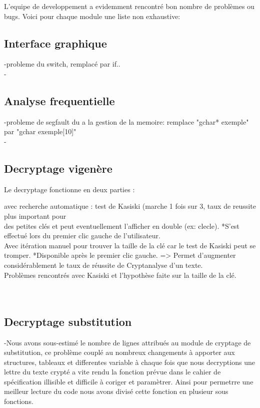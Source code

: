 \documentclass[a4]{article}
\begin{document}
	L'equipe de developpement a evidemment rencontré bon nombre de problèmes ou bugs. Voici pour chaque
	module une liste non exhaustive:
	\subsection{Interface graphique}
	-probleme du switch, remplacé par if..\\
	-
	\subsection{Analyse frequentielle}
	-probleme de segfault du a la gestion de la memoire: remplace "gchar* exemple" par "gchar exemple[10]"\\
	-
	\subsection{Decryptage vigenère}
 		Le decryptage fonctionne en deux parties :
 		
 		avec recherche automatique : test de Kasiski (marche 1 fois sur 3, taux de reussite plus important pour \\
 		des petites clés et peut eventuellement l'afficher en double (ex: clecle). 
 		*S'est effectué lors du premier clic gauche de l'utilisateur. \\
 		
 		Avec itération manuel pour trouver la taille de la clé car le test de Kasiski peut se tromper.
 		*Disponible après le premier clic gauche.
 		=> Permet d'augmenter considérablement le taux de réussite de Cryptanalyse d'un texte. \\
  		
 		Problèmes rencontrés avec Kasiski et l'hypothèse faite sur la taille de la clé. \\
  		 \\ \\
	
	\subsection{Decryptage substitution}
	-Nous avons sous-estimé le nombre de lignes attribués au module de cryptage de substitution,
	 ce problème couplé au nombreux changements à apporter aux structures, tableaux et differentes
	  variable à chaque fois que nous decryptions une lettre du texte crypté a vite rendu la fonction
	   prévue dans le cahier de spécification illisible et difficile à coriger et paramètrer. Ainsi 
	   pour permetrre une meilleur lecture du code nous avons divisé cette fonction en plusieur sous fonctions. \\ \\
\end{document}
